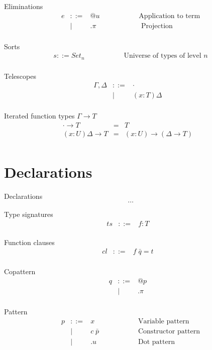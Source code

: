 \documentclass[acmlarge]{acmart}\settopmatter{}
\renewcommand{\|}{|}
\begin{document}
Eliminations
\[\begin{array}{lrll}
e &::=& @u                & \hspace{2cm}\text{Application to term} \\
    &|& .\pi               & \hspace{2cm}\text{ Projection} \\
\end{array} \]

Sorts
\[\begin{array}{lrll}
s ::= Set_n             & \hspace{2cm} \text{Universe of types of level $n$} \\
\end{array} \]

Telescopes
\[\begin{array}{lrll}
\Gamma , \Delta &::=& ·  & \\
      &  |& (x : T)\Delta & \\
\end{array} \]

Iterated function types $\Gamma \rightarrow T$
\[\begin{array}{lrll}
· \rightarrow T &=& T &\\
(x : U)\Delta \rightarrow T &=& (x : U) \rightarrow (\Delta \rightarrow T) & \\
\end{array} \]


\section{Declarations}
\label{sec:declarations}

Declarations
\[ \hdots \]

Type signatures
\[\begin{array}{lrll}
ts &::=& f : T &\\
\end{array} \]

Function clauses
\[\begin{array}{lrll}
cl &::=& f\; \bar{q} = t &\\
\end{array} \]

Copattern
\[\begin{array}{lrll}
q &::=& @p &\\
  &  |& .\pi \\ 
\end{array} \]

Pattern
\[\begin{array}{lrll}
p &::=& x     &  \hspace{2cm} \text{Variable pattern} \\
    &|& c\; \bar{p}    &  \hspace{2cm} \text{Constructor pattern} \\
    &|& .u      &  \hspace{2cm} \text{Dot pattern} \\
\end{array} \]
\end{document}
